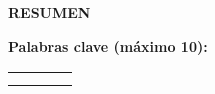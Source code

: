 \newpage
\pagestyle{nonumber}

\begin{center}
    \textbf{
        RESUMEN
    }
    \\[\baselineskip]
\end{center}

\begin{center}
    \setlength{}
\end{center}

\vspace{0.3cm}
\textbf{Palabras clave (máximo 10):}
\begin{center}
    \renewcommand{\arraystretch}{1.5}\begin{tabular}{|m{}|m{}|m{}|m{}|}
        \hline
            \centering\arraybackslash{?} & \centering\arraybackslash{?} & \centering\arraybackslash{?} & \centering\arraybackslash{?} \\
        \hline
        \centering\arraybackslash{?} & \centering\arraybackslash{?} & \centering\arraybackslash{?} & \centering\arraybackslash{?} \\
        \hline
        \centering\arraybackslash{?} & \centering\arraybackslash{?} \\
        \cline{1-2}
    \end{tabular}
\end{center}
